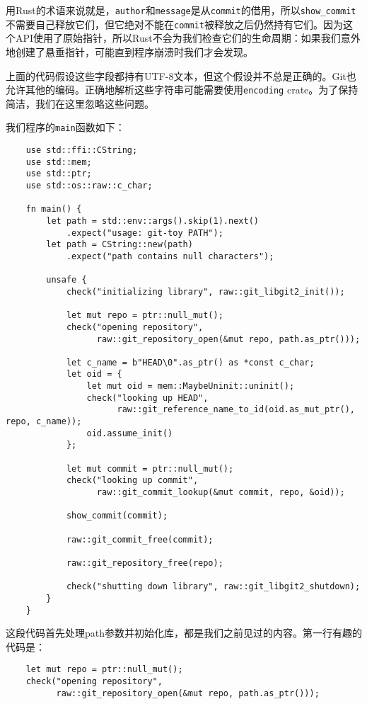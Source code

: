 用Rust的术语来说就是，\texttt{author}和\texttt{message}是从\texttt{commit}的借用，所以\texttt{show\_commit}不需要自己释放它们，但它绝对不能在\texttt{commit}被释放之后仍然持有它们。因为这个API使用了原始指针，所以Rust不会为我们检查它们的生命周期：如果我们意外地创建了悬垂指针，可能直到程序崩溃时我们才会发现。

上面的代码假设这些字段都持有UTF-8文本，但这个假设并不总是正确的。Git也允许其他的编码。正确地解析这些字符串可能需要使用\texttt{encoding} crate。为了保持简洁，我们在这里忽略这些问题。

我们程序的\texttt{main}函数如下：
\begin{verbatim}
    use std::ffi::CString;
    use std::mem;
    use std::ptr;
    use std::os::raw::c_char;

    fn main() {
        let path = std::env::args().skip(1).next()
            .expect("usage: git-toy PATH");
        let path = CString::new(path)
            .expect("path contains null characters");

        unsafe {
            check("initializing library", raw::git_libgit2_init());

            let mut repo = ptr::null_mut();
            check("opening repository",
                  raw::git_repository_open(&mut repo, path.as_ptr()));
                
            let c_name = b"HEAD\0".as_ptr() as *const c_char;
            let oid = {
                let mut oid = mem::MaybeUninit::uninit();
                check("looking up HEAD",
                      raw::git_reference_name_to_id(oid.as_mut_ptr(), repo, c_name));
                oid.assume_init()
            };

            let mut commit = ptr::null_mut();
            check("looking up commit",
                  raw::git_commit_lookup(&mut commit, repo, &oid));
            
            show_commit(commit);

            raw::git_commit_free(commit);

            raw::git_repository_free(repo);

            check("shutting down library", raw::git_libgit2_shutdown);
        }
    }
\end{verbatim}

这段代码首先处理path参数并初始化库，都是我们之前见过的内容。第一行有趣的代码是：
\begin{verbatim}
    let mut repo = ptr::null_mut();
    check("opening repository",
          raw::git_repository_open(&mut repo, path.as_ptr()));
\end{verbatim}

